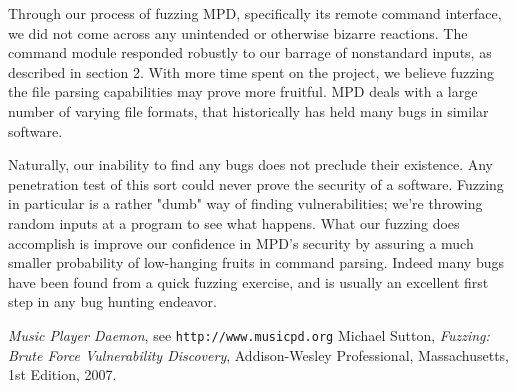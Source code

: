 \documentclass[10pt]{article}
\begin{document}
Through our process of fuzzing MPD, specifically its remote command interface, we did not come across any unintended or otherwise bizarre reactions. The command module responded robustly to our barrage of nonstandard inputs, as described in section 2. With more time spent on the project, we believe fuzzing the file parsing capabilities may prove more fruitful. MPD deals with a large number of varying file formats, that historically has held many bugs in similar software.

Naturally, our inability to find any bugs does not preclude their existence. Any penetration test of this sort could never prove the security of a software. Fuzzing in particular is a rather "dumb" way of finding vulnerabilities; we're throwing random inputs at a program to see what happens. What our fuzzing does accomplish is improve our confidence in MPD's security by assuring a much smaller probability of low-hanging fruits in command parsing. Indeed many bugs have been found from a quick fuzzing exercise, and is usually an excellent first step in any bug hunting endeavor.

\begin{thebibliography}{2}
    \emph{Music Player Daemon}, 
    see \texttt{http://www.musicpd.org}
    Michael Sutton,
    \emph{Fuzzing: Brute Force Vulnerability Discovery},
    Addison-Wesley Professional, Massachusetts,
    1st Edition,
    2007.
\end{thebibliography}
\end{document}

